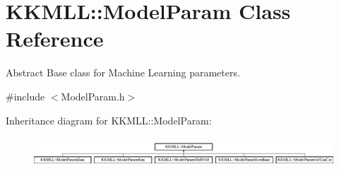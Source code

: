 \hypertarget{class_k_k_m_l_l_1_1_model_param}{}\section{K\+K\+M\+LL\+:\+:Model\+Param Class Reference}
\label{class_k_k_m_l_l_1_1_model_param}


Abstract Base class for Machine Learning parameters.  




{\ttfamily \#include $<$Model\+Param.\+h$>$}

Inheritance diagram for K\+K\+M\+LL\+:\+:Model\+Param\+:\begin{figure}[H]
\begin{center}
\leavevmode
\includegraphics[height=1.125628cm]{class_k_k_m_l_l_1_1_model_param}
\end{center}
\end{figure}
